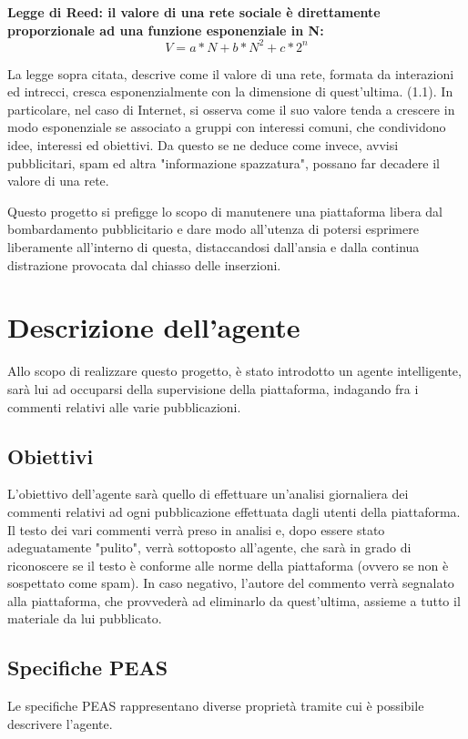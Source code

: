 \documentclass{report}
\begin{document}
    \textbf{Legge di Reed: il valore di una rete sociale è direttamente proporzionale ad una funzione esponenziale in N:}
    \begin{equation} %
        V=a*N+b*N^2 + c*2^n
    \end{equation}
    

    La legge sopra citata, descrive come il valore di una rete, formata da interazioni ed intrecci, cresca esponenzialmente con la dimensione di quest'ultima. (1.1).
    In particolare, nel caso di Internet, si osserva come il suo valore tenda a crescere in modo esponenziale se associato a gruppi con interessi
     comuni, che condividono idee, interessi ed obiettivi.
    Da questo se ne deduce come invece, avvisi pubblicitari, spam ed altra "informazione spazzatura", possano far decadere il valore di una rete.
    
    Questo progetto si prefigge lo scopo di manutenere una piattaforma libera dal bombardamento pubblicitario e dare modo all'utenza di potersi esprimere liberamente
    all'interno di questa, distaccandosi dall'ansia e dalla continua distrazione provocata dal chiasso delle inserzioni.
    
    \chapter{Descrizione dell'agente}
    Allo scopo di realizzare questo progetto, è stato introdotto un agente intelligente, sarà lui ad occuparsi della supervisione della piattaforma, indagando fra i 
    commenti relativi alle varie pubblicazioni.
    \section{Obiettivi}
    L'obiettivo dell'agente sarà quello di effettuare un'analisi giornaliera dei commenti relativi ad ogni pubblicazione effettuata dagli utenti della piattaforma.
    Il testo dei vari commenti verrà preso in analisi e, dopo essere stato adeguatamente "pulito", verrà sottoposto all'agente, che sarà in grado di riconoscere se il 
    testo è conforme alle norme della piattaforma (ovvero se non è sospettato come spam). \newline
    In caso negativo, l'autore del commento verrà segnalato alla piattaforma, che provvederà ad eliminarlo da quest'ultima, assieme a tutto il materiale da lui pubblicato.

    \section{Specifiche PEAS}
    Le specifiche PEAS rappresentano diverse proprietà tramite cui è possibile descrivere l'agente. \newline
\end{document}
